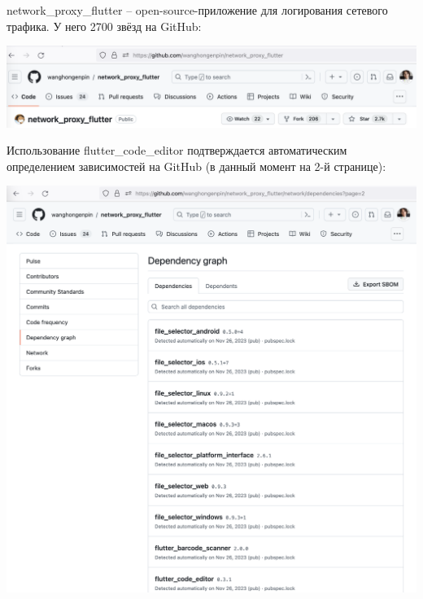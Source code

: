 
network\_proxy\_flutter -- open-source-приложение для логирования сетевого трафика.
У него 2700 звёзд на GitHub:

\begin{center}
    \includegraphics[width=\textwidth]{stars}
\end{center}

Использование flutter\_code\_editor подтверждается автоматическим определением зависимостей на GitHub
(в данный момент на 2-й странице):

\begin{center}
    \includegraphics[width=\textwidth]{dependencies}
\end{center}

\pagebreak
